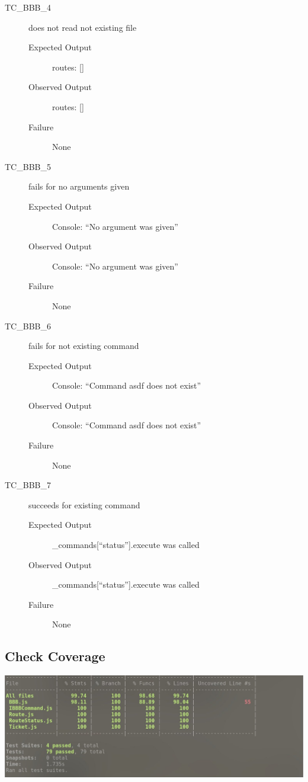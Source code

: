 \documentclass[11pt]{article}
\begin{document}
\begin{description}
\item[{TC\_BBB\_4}] does not read not existing file
\begin{description}
\item[{Expected Output}] routes: []
\item[{Observed Output}] routes: []
\item[{Failure}] None
\end{description}

\item[{TC\_BBB\_5}] fails for no arguments given
\begin{description}
\item[{Expected Output}] Console: “No argument was given”
\item[{Observed Output}] Console: “No argument was given”
\item[{Failure}] None
\end{description}

\item[{TC\_BBB\_6}] fails for not existing command
\begin{description}
\item[{Expected Output}] Console: “Command asdf does not exist”
\item[{Observed Output}] Console: “Command asdf does not exist”
\item[{Failure}] None
\end{description}

\item[{TC\_BBB\_7}] succeeds for existing command
\begin{description}
\item[{Expected Output}] \_commands[“status”].execute was called
\item[{Observed Output}] \_commands[“status”].execute was called
\item[{Failure}] None
\end{description}
\end{description}

\subsection{Check Coverage}
\label{sec:org336fa18}

\begin{center}
\includegraphics[width=.9\linewidth]{documentation.org.img/org_20181130_184134_VwJ8or.jpg}
\end{center}
\end{document}
